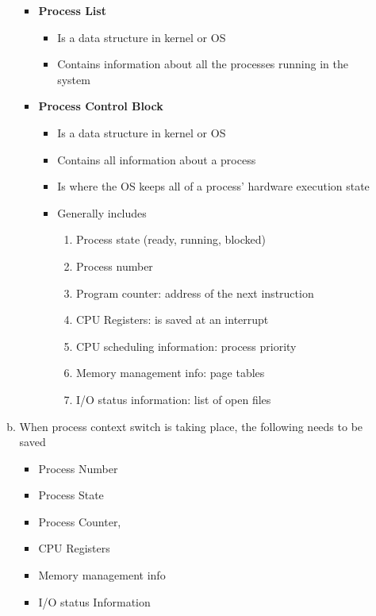 \documentclass[12pt]{article}
\begin{document}
\begin{enumerate}[1.]
\begin{enumerate}[a)]
\begin{itemize}
            \item \textbf{Process List}

            \begin{itemize}
                \item Is a data structure in kernel or OS
                \item Contains information about all the processes running in the system
            \end{itemize}

            \item \textbf{Process Control Block}

            \begin{itemize}
                \item Is a data structure in kernel or OS
                \item Contains all information about a process
                \item Is where the OS keeps all of a process' hardware execution state
                \item Generally includes

                \begin{enumerate}[1.]
                    \item Process state (ready, running, blocked)
                    \item Process number
                    \item Program counter: address of the next instruction
                    \item CPU Registers: is saved at an interrupt
                    \item CPU scheduling information: process priority
                    \item Memory management info: page tables
                    \item I/O status information: list of open files
                \end{enumerate}
            \end{itemize}
        \end{itemize}

        \item

        When process context switch is taking place, the following needs to be saved

        \begin{itemize}
            \item Process Number
            \item Process State
            \item Process Counter,
            \item CPU Registers
            \item Memory management info
            \item I/O status Information
        \end{itemize}


\end{enumerate}
\end{enumerate}
\end{document}
